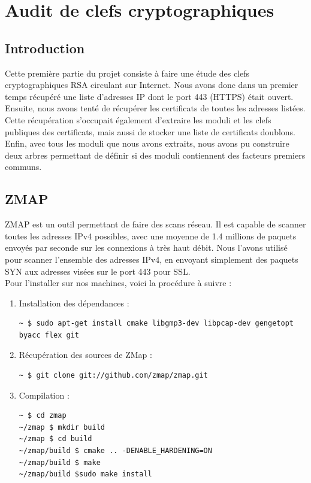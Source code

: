 \chapter{Audit de clefs cryptographiques}

\section{Introduction}
Cette première partie du projet consiste à faire une étude des clefs cryptographiques RSA circulant sur Internet. Nous avons donc dans un premier temps récupéré une liste d'adresses IP dont le port 443 (HTTPS) était ouvert.\\


Ensuite, nous avons tenté de récupérer les certificats de toutes les adresses listées. Cette récupération s'occupait également d'extraire les moduli et les clefs publiques des certificats, mais aussi de stocker une liste de certificats doublons.\\


Enfin, avec tous les moduli que nous avons extraits, nous avons pu construire deux arbres permettant de définir si des moduli contiennent des facteurs premiers communs.

\section{ZMAP}

ZMAP est un outil permettant de faire des scans réseau.  Il est capable de scanner toutes les adresses IPv4 possibles, avec une moyenne de 1.4 millions de paquets envoyés par seconde sur les connexions à très haut débit. Nous l'avons utilisé pour scanner l'ensemble des adresses IPv4, en envoyant simplement des paquets SYN aux adresses visées sur le port 443 pour SSL.\\


Pour l'installer sur nos machines, voici la procédure à suivre :
\begin{enumerate}
\item Installation des dépendances :
\begin{verbatim}
~ $ sudo apt-get install cmake libgmp3-dev libpcap-dev gengetopt byacc flex git
\end{verbatim}
\item Récupération des sources de ZMap :
\begin{verbatim}
~ $ git clone git://github.com/zmap/zmap.git
\end{verbatim}
\item Compilation :
\begin{verbatim}
~ $ cd zmap
~/zmap $ mkdir build
~/zmap $ cd build
~/zmap/build $ cmake .. -DENABLE_HARDENING=ON
~/zmap/build $ make
~/zmap/build $sudo make install
\end{verbatim}
\end{enumerate}


